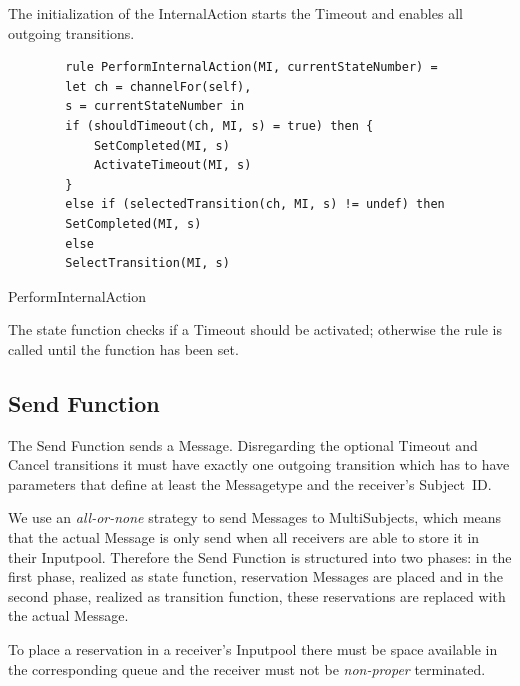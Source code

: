 The initialization of the InternalAction starts the Timeout and enables all
outgoing transitions.

\begin{listing}[H]
	\begin{verbatim}
		rule PerformInternalAction(MI, currentStateNumber) =
		let ch = channelFor(self),
		s = currentStateNumber in
		if (shouldTimeout(ch, MI, s) = true) then {
			SetCompleted(MI, s)
			ActivateTimeout(MI, s)
		}
		else if (selectedTransition(ch, MI, s) != undef) then
		SetCompleted(MI, s)
		else
		SelectTransition(MI, s)
	\end{verbatim}
	\caption{PerformInternalAction}
	\label{lst:shortasm:PerformInternalAction}
\end{listing}


The state function checks if a Timeout should be activated; otherwise the
 rule is called until the  function has
been set.

\subsection{Send Function}

The Send Function sends a Message. Disregarding the optional Timeout and Cancel
transitions it must have exactly one outgoing transition which has to have parameters that
define at least the Messagetype and the receiver's Subject~ID.

We use an \textit{all-or-none} strategy to send Messages to MultiSubjects,
which means that the actual Message is only send when all receivers are able
to store it in their Inputpool. Therefore the Send Function is structured into
two phases: in the first phase, realized as state function, reservation Messages
are placed and in the second phase, realized as transition function, these reservations
are replaced with the actual Message.

To place a reservation in a receiver's Inputpool there must be space available
in the corresponding queue and the receiver must not be
\textit{non-proper} terminated.

